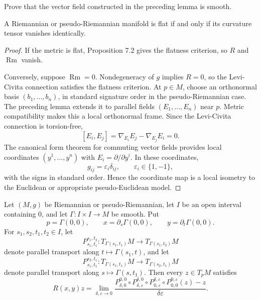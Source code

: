 \begin{exercise}
\label{exer:constructed-vector-field-smooth}
Prove that the vector field constructed in the preceding lemma is smooth.
\end{exercise}

\begin{theorem}
\label{thm:flatness-iff-zero-curvature}
A Riemannian or pseudo-Riemannian manifold is flat if and only if its curvature
tensor vanishes identically.
\end{theorem}

\begin{proof}
\sketch If the metric is flat, Proposition 7.2 gives the flatness criterion,
so $R$ and $\operatorname{Rm}$ vanish.

Conversely, suppose $\operatorname{Rm}=0$. Nondegeneracy of $g$ implies
$R=0$, so the Levi-Civita connection satisfies the flatness criterion. At
$p\in M$, choose an orthonormal basis $(b_1,\ldots,b_n)$, in standard signature
order in the pseudo-Riemannian case. The preceding lemma extends it to parallel
fields $(E_1,\ldots,E_n)$ near $p$. Metric compatibility makes this a local
orthonormal frame. Since the Levi-Civita connection is torsion-free,
\[
[E_i,E_j]=\nabla_{E_i}E_j-\nabla_{E_j}E_i=0.
\]
The canonical form theorem for commuting vector fields provides local
coordinates $(y^1,\ldots,y^n)$ with $E_i=\partial/\partial y^i$. In these
coordinates,
\[
g_{ij}=\varepsilon_i\delta_{ij},
\qquad \varepsilon_i\in\{1,-1\},
\]
with the signs in standard order. Hence the coordinate map is a local isometry
to the Euclidean or appropriate pseudo-Euclidean model.
\end{proof}

\begin{theorem}
\label{thm:curvature-endomorphism-formula}
Let $(M,g)$ be Riemannian or pseudo-Riemannian, let $I$ be an open interval
containing $0$, and let $\Gamma\colon I\times I\to M$ be smooth. Put
\[
p=\Gamma(0,0),
\qquad x=\partial_s\Gamma(0,0),
\qquad y=\partial_t\Gamma(0,0).
\]
For $s_1,s_2,t_1,t_2\in I$, let
\[
P_{s_1,t_1}^{s_1,t_2}
\colon T_{\Gamma(s_1,t_1)}M\longrightarrow T_{\Gamma(s_1,t_2)}M
\]
denote parallel transport along $t\mapsto\Gamma(s_1,t)$, and let
\[
P_{s_1,t_1}^{s_2,t_1}
\colon T_{\Gamma(s_1,t_1)}M\longrightarrow T_{\Gamma(s_2,t_1)}M
\]
denote parallel transport along $s\mapsto\Gamma(s,t_1)$. Then every
$z\in T_pM$ satisfies
\begin{equation}
R(x,y)z
=\lim_{\delta,\varepsilon\to0}
\frac{
P_{\delta,0}^{0,0}\circ
P_{\delta,\varepsilon}^{\delta,0}\circ
P_{0,\varepsilon}^{\delta,\varepsilon}\circ
P_{0,0}^{0,\varepsilon}(z)-z
}{\delta\varepsilon}. \tag{7.10}
\end{equation}
\end{theorem}


